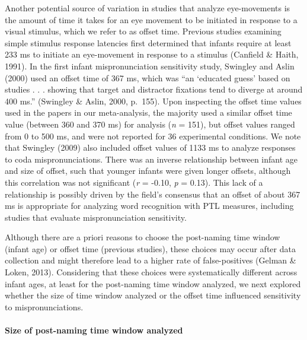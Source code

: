 \documentclass[man]{apa6}
\let\oldparagraph\paragraph
\renewcommand{\paragraph}[1]{\oldparagraph{#1}\mbox{}}
\theoremstyle{definition}
\theoremstyle{definition}
\theoremstyle{definition}
\theoremstyle{remark}
\begin{document}
Another potential source of variation in studies that analyze
eye-movements is the amount of time it takes for an eye movement to be
initiated in response to a visual stimulus, which we refer to as offset
time. Previous studies examining simple stimulus response latencies
first determined that infants require at least 233 ms to initiate an
eye-movement in response to a stimulus (Canfield \& Haith, 1991). In the
first infant mispronunciation sensitivity study, Swingley and Aslin
(2000) used an offset time of 367 ms, which was \enquote{an
\enquote{educated guess} based on studies . . . showing that target and
distractor fixations tend to diverge at around 400 ms.} (Swingley \&
Aslin, 2000, p.~155). Upon inspecting the offset time values used in the
papers in our meta-analysis, the majority used a similar offset time
value (between 360 and 370 ms) for analysis (\emph{n} = 151), but offset
values ranged from 0 to 500 ms, and were not reported for 36
experimental conditions. We note that Swingley (2009) also included
offset values of 1133 ms to analyze responses to coda mispronunciations.
There was an inverse relationship between infant age and size of offset,
such that younger infants were given longer offsets, although this
correlation was not significant (\emph{r} = -0.10, \emph{p} = 0.13).
This lack of a relationship is possibly driven by the field's consensus
that an offset of about 367 ms is appropriate for analyzing word
recognition with PTL measures, including studies that evaluate
mispronunciation sensitivity.

Although there are a priori reasons to choose the post-naming time
window (infant age) or offset time (previous studies), these choices may
occur after data collection and might therefore lead to a higher rate of
false-positives (Gelman \& Loken, 2013). Considering that these choices
were systematically different across infant ages, at least for the
post-naming time window analyzed, we next explored whether the size of
time window analyzed or the offset time influenced sensitivity to
mispronunciations.

\paragraph{Size of post-naming time window
analyzed}\label{size-of-post-naming-time-window-analyzed}
\end{document}
